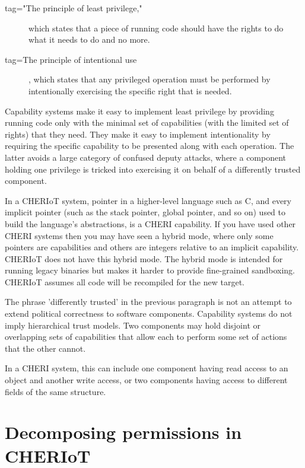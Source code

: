 \begin{description}
	\item[tag="The principle of least privilege,"]{ which states that a piece of running code should have the rights to do what it needs to do and no more.}
	\item[tag=The principle of intentional use]{, which states that any privileged operation must be performed by intentionally exercising the specific right that is needed.}
\end{description}

Capability systems make it easy to implement least privilege by providing running code only with the minimal set of capabilities (with the limited set of rights) that they need.
They make it easy to implement intentionality by requiring the specific capability to be presented along with each operation.
The latter avoids a large category of confused deputy attacks, where a component holding one privilege is tricked into exercising it on behalf of a differently trusted component.

\begin{note}
	In a CHERIoT system,  pointer in a higher-level language such as C, and every implicit pointer (such as the stack pointer, global pointer, and so on) used to build the language's abstractions, is a CHERI capability.
	If you have used other CHERI systems then you may have seen a hybrid mode, where only some pointers are capabilities and others are integers relative to an implicit capability.
	CHERIoT does not have this hybrid mode.
	The hybrid mode is intended for running legacy binaries but makes it harder to provide fine-grained sandboxing.
	CHERIoT assumes all code will be recompiled for the new target.
\end{note}

The phrase 'differently trusted' in the previous paragraph is not an attempt to extend political correctness to software components.
Capability systems do not imply hierarchical trust models.
Two components may hold disjoint or overlapping sets of capabilities that allow each to perform some set of actions that the other cannot.

In a CHERI system, this can include one component having read access to an object and another write access, or two components having access to different fields of the same structure.

\section[label=permissions]{Decomposing permissions in CHERIoT}

